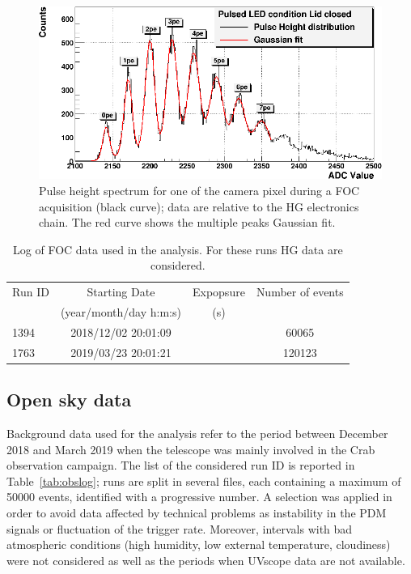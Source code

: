\begin{figure}[ht!!]
\centering
\includegraphics[angle=0, width=12.5cm]{Figure/PIXEL60_PDM20_HG_DICEMBRE_2018.eps}
\vspace{0.5cm}
\caption{ Pulse height spectrum for one of the camera pixel during a FOC acquisition (black curve); data are relative to the HG electronics chain. The red curve shows the multiple peaks Gaussian fit.}
\label{fig:FOC}
\end{figure}

\begin{table}[htbp!!]
\centering
\caption{Log of FOC data used in the analysis. For these runs HG data are considered. }
\label{tab:FOC}
\begin{tabular}{lccc}
\hline\hline
Run ID & Starting Date &  Expopsure & Number of events \\
               & (year/month/day h:m:s) & (s)   \\
\hline     
1394 & 2018/12/02 20:01:09  &  & 60065     \\
1763 & 2019/03/23 20:01:21  &  & 120123    \\ 
\hline\hline
\end{tabular}
\end{table}

\subsection{Open sky data} 
\label{subs:skydata}

Background data used for the analysis refer to the period between December 2018 and March 2019 when the telescope was mainly involved in the Crab observation campaign. The list of the considered run ID is reported in Table~\ref{tab:obslog}; runs are split in several files, each containing a maximum of 50000 events, identified with a progressive number.
A selection was applied in order to avoid data affected by technical problems as instability in the PDM signals or fluctuation of the trigger rate. Moreover, intervals with bad atmospheric conditions 
(high humidity, low external temperature, cloudiness) were not considered as well as the periods when UVscope data are not available.


